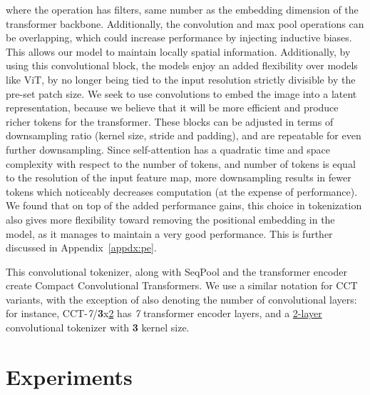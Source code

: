 \documentclass[10pt,twocolumn,letterpaper]{article}
\begin{document}
where the  operation has  filters, same number as the embedding dimension of the transformer backbone.
Additionally, the convolution and max pool operations can be overlapping, which could increase performance by injecting inductive biases.
This allows our model to maintain locally spatial information.
Additionally, by using this convolutional block, the models enjoy an added flexibility over models like ViT, by no longer being tied to the input resolution strictly divisible by the pre-set patch size.
We seek to use convolutions to embed the image into a latent representation, because we believe that it will be more efficient and produce richer tokens for the transformer.
These blocks can be adjusted in terms of downsampling ratio (kernel size, stride and padding), and are repeatable for even further downsampling. Since self-attention has a quadratic time and space complexity with respect to the number of tokens, and number of tokens is equal to the resolution of the input feature map, more downsampling results in fewer tokens which noticeably decreases computation (at the expense of performance).
We found that on top of the added performance gains, this choice in tokenization also gives more flexibility toward removing the positional embedding in the model, as it manages to maintain a very good performance.
This is further discussed in Appendix~\ref{appdx:pe}.

This convolutional tokenizer, along with SeqPool and the transformer encoder create Compact Convolutional Transformers. We use a similar notation for CCT variants, with the exception of also denoting the number of convolutional layers: for instance, CCT-\textit{7}/\textbf{3}x\underline{2} has \textit{7} transformer encoder layers, and a \underline{2-layer} convolutional tokenizer with \textbf{3} kernel size.


\section{Experiments}
\label{sec:experiments}
\end{document}
